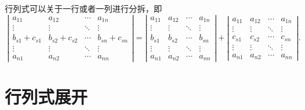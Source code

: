 \begin{theorem}[行列式分拆]
  行列式可以关于一行或者一列进行分拆，即
  \begin{equation*}
    \left|\begin{array}{cccc}
            a_{11} & a_{12} & \cdots & a_{1 n} \\
            \vdots & \vdots & \ddots & \vdots \\
            b_{s 1}+c_{s 1} & b_{s 2}+c_{s 2} & \cdots & b_{s n}+c_{s n} \\
            \vdots & \vdots & \ddots & \vdots \\
            a_{n 1} & a_{n 2} & \cdots & a_{n n}
          \end{array}\right|=\left|\begin{array}{cccc}
                                     a_{11} & a_{12} & \cdots & a_{1 n} \\
                                     \vdots & \vdots & \ddots & \vdots \\
                                     b_{s 1} & b_{s 2} & \cdots & b_{s n} \\
                                     \vdots & \vdots & \ddots & \vdots \\
                                     a_{n 1} & a_{n 2} & \cdots & a_{n n}
                                   \end{array}\right|+\left|\begin{array}{cccc}
                                                              a_{11} & a_{12} & \cdots & a_{1 n} \\
                                                              \vdots & \vdots & \ddots & \vdots \\
                                                              c_{s 1} & c_{s 2} & \cdots & c_{s n} \\
                                                              \vdots & \vdots & \ddots & \vdots \\
                                                              a_{n 1} & a_{n 2} & \cdots & a_{n n}
                                                            \end{array}\right| .
  \end{equation*}
\end{theorem}



\section{行列式展开}

